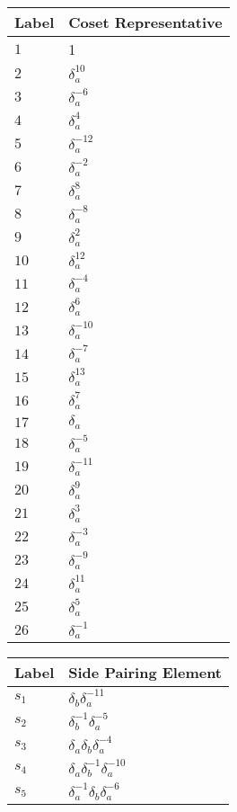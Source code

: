 \documentclass{article}
\begin{document}

\begin{center}
\begin{tabular}{ll}
\toprule
Label & Coset Representative\\
\midrule
$1$ & 1 \\
$2$ & $\delta_a^{10}$ \\
$3$ & $\delta_a^{-6}$ \\
$4$ & $\delta_a^{4}$ \\
$5$ & $\delta_a^{-12}$ \\
$6$ & $\delta_a^{-2}$ \\
$7$ & $\delta_a^{8}$ \\
$8$ & $\delta_a^{-8}$ \\
$9$ & $\delta_a^{2}$ \\
$10$ & $\delta_a^{12}$ \\
$11$ & $\delta_a^{-4}$ \\
$12$ & $\delta_a^{6}$ \\
$13$ & $\delta_a^{-10}$ \\
$14$ & $\delta_a^{-7}$ \\
$15$ & $\delta_a^{13}$ \\
$16$ & $\delta_a^{7}$ \\
$17$ & $\delta_a^{}$ \\
$18$ & $\delta_a^{-5}$ \\
$19$ & $\delta_a^{-11}$ \\
$20$ & $\delta_a^{9}$ \\
$21$ & $\delta_a^{3}$ \\
$22$ & $\delta_a^{-3}$ \\
$23$ & $\delta_a^{-9}$ \\
$24$ & $\delta_a^{11}$ \\
$25$ & $\delta_a^{5}$ \\
$26$ & $\delta_a^{-1}$ \\
\bottomrule
\end{tabular}
\hfill
\begin{tabular}{ll}
\toprule
Label & Side Pairing Element\\
\midrule
$s_{1}$ & $\delta_b^{}\delta_a^{-11}$ \\
$s_{2}$ & $\delta_b^{-1}\delta_a^{-5}$ \\
$s_{3}$ & $\delta_a^{}\delta_b^{}\delta_a^{-4}$ \\
$s_{4}$ & $\delta_a^{}\delta_b^{-1}\delta_a^{-10}$ \\
$s_{5}$ & $\delta_a^{-1}\delta_b^{}\delta_a^{-6}$ \\

\end{tabular}
\end{center}
\end{document}
